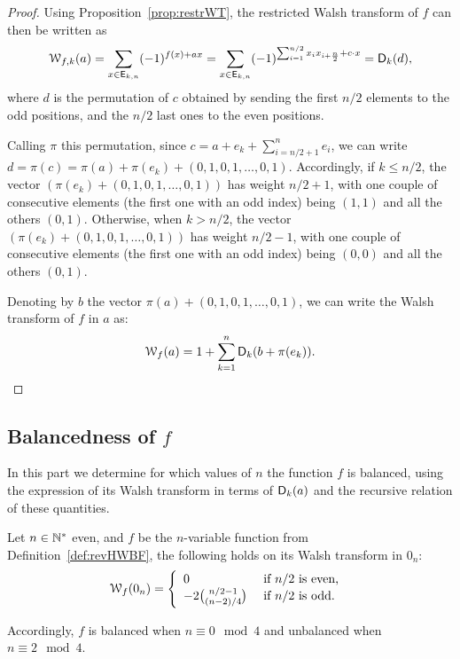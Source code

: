 \documentclass[11pt]{llncs}
\begin{document}
\begin{proof}
Using Proposition~\ref{prop:restrWT}, the restricted Walsh transform of $f$ can then be written as \[
\wtk{f}{k}(a)=\sum_{x \in \Ekn{k}{n}} (-1)^{f(x)+ax}=\sum_{x \in \Ekn{k}{n}} (-1)^{\sum_{i=1}^{n/2} x_i x_{i+\frac{n}{2}}+ c \cdot x}=\Dnka{n}{k}{d},\]
where $d$ is the permutation of $c$ obtained by sending the first $n/2$ elements to the odd positions, and the $n/2$ last ones to the even positions. 

Calling $\pi$ this permutation, since $c=a+e_k+\sum_{i=n/2+1}^n e_i$, we can write $d=\pi(c)=\pi(a)+ \pi(e_k)+ (0,1,0,1,\ldots,0,1)$. 
Accordingly, if $k\le n/2$, the vector $(\pi(e_k)+ (0,1,0,1,\ldots,0,1))$ has weight $n/2+1$, with one couple of consecutive elements (the first one with an odd index) being $(1,1)$ and all the others $(0,1)$. 
Otherwise,  when $k> n/2$, the vector $(\pi(e_k)+ (0,1,0,1,\ldots,0,1))$ has weight $n/2-1$, with one couple of consecutive elements (the first one with an odd index) being $(0,0)$ and all the others $(0,1)$. 

Denoting by $b$ the vector $\pi(a)+(0,1,0,1,\ldots,0,1)$, we can write the Walsh transform of $f$ in $a$ as:
\[ \wt{f}(a)=1+\sum_{k=1}^n\Dnka{n}{k}{b+\pi(e_k)}.\qedhere\]
\end{proof}

\subsection{Balancedness of $f$}\label{sec:balancedness}

In this part we determine for which values of $n$ the function $f$ is balanced, using the expression of its Walsh transform in terms of $\Dnka{n}{k}{a}$ and the recursive relation of these quantities.


\begin{theorem}[Balancedness of $f$]
	Let $n \in \N^*$ even, and $f$ be the $n$-variable function from Definition~\ref{def:revHWBF}, the following holds on its Walsh transform in $0_n$:
	\[\wt{f}(0_n)= \left \{
	\begin{array}{l l}
	0 & \text{ if } n/2 \text{ is even, } \\
	-2 \binom{n/2-1}{(n-2)/4} & \text{ if }  n/2 \text{ is odd.}
	\end{array}\right.\]
	
	Accordingly, $f$ is balanced when $n \equiv 0\mod 4$ and unbalanced when $n\equiv 2 \mod 4$.
	
\end{theorem}
\end{document}
